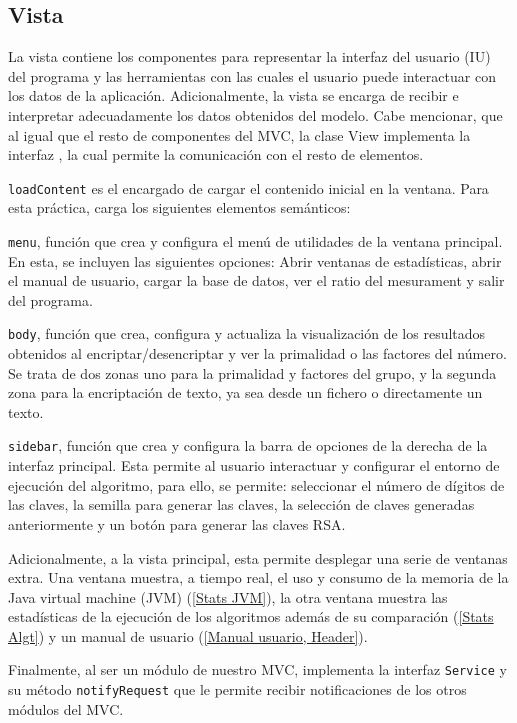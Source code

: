 \subsection{Vista}

La vista contiene los componentes para representar la interfaz del usuario (IU) del programa y las herramientas con las cuales el usuario puede interactuar con los datos de la aplicación. Adicionalmente, la vista se encarga de recibir e interpretar adecuadamente los datos obtenidos del modelo. Cabe mencionar, que al igual que el resto de componentes del MVC, la clase View implementa la interfaz , la cual permite la comunicación con el resto de elementos.\bigskip

\texttt{loadContent} es el encargado de cargar el contenido inicial en la ventana. Para esta práctica, carga los siguientes elementos semánticos:\bigskip

\texttt{menu}, función que crea y configura el menú de utilidades de la ventana principal. En esta, se incluyen las siguientes opciones: Abrir ventanas de estadísticas, abrir el manual de usuario, cargar la base de datos, ver el ratio del mesurament y salir del programa.\bigskip

\texttt{body}, función que crea, configura y actualiza la visualización de los resultados obtenidos al encriptar/desencriptar y ver la primalidad o las factores del número. Se trata de dos zonas uno para la primalidad y factores del grupo, y la segunda zona para la encriptación de texto, ya sea desde un fichero o directamente un texto.\bigskip

\texttt{sidebar}, función que crea y configura la barra de opciones de la derecha de la interfaz principal. Esta permite al usuario interactuar y configurar el entorno de ejecución del algoritmo, para ello, se permite: seleccionar el número de dígitos de las claves, la semilla para generar las claves, la selección de claves generadas anteriormente y un botón para generar las claves RSA.\bigskip

Adicionalmente, a la vista principal, esta permite desplegar una serie de ventanas extra. Una ventana muestra, a tiempo real, el uso y consumo de la memoria de la Java virtual machine (JVM) (\ref{Stats JVM}), la otra ventana muestra las estadísticas de la ejecución de los algoritmos además de su comparación (\ref{Stats Algt}) y un manual de usuario (\ref{Manual usuario, Header}).\bigskip

Finalmente, al ser un módulo de nuestro MVC, implementa la interfaz \texttt{Service} y su método \texttt{notifyRequest} que le permite recibir notificaciones de los otros módulos del MVC.

